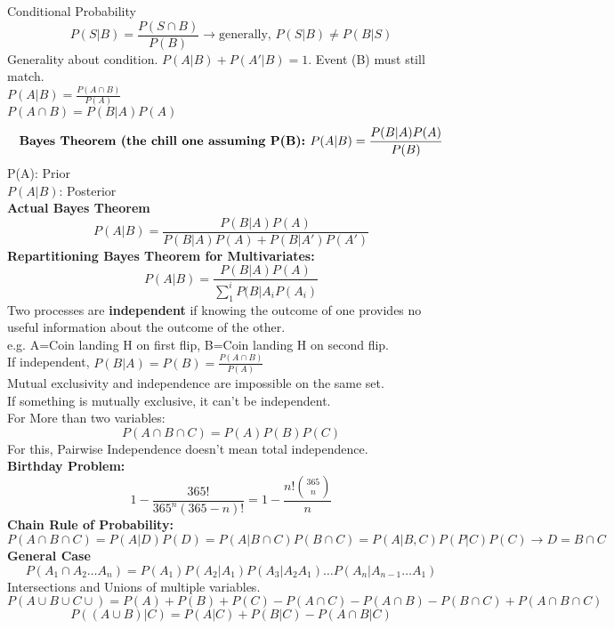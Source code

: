 \documentclass[a4paper, 12pt]{article}
\begin{document}
\begin{section}{Conditional Probability}
\begin{equation} 
P(S|B) = \frac{P(S\cap B)}{P(B)} \to \mbox{generally, } P(S|B)\neq P(B|S)
\end{equation}
Generality about condition. $P(A|B) + P(A'|B) = 1$. Event (B) must still match.\\
$P(A|B)=\frac{P(A\cap B)}{P(A)}$\\
$P(A\cap B)=P(B|A)P(A)$
\begin{equation} 
\mbox{\textbf{Bayes Theorem (the chill one assuming P(B):  }}
P(A|B)=\frac{P(B|A)P(A)}{P(B)}
\end{equation}
P(A): Prior\\
$P(A|B)$: Posterior\\
\textbf{Actual Bayes Theorem}
\begin{equation} 
	P(A|B)=\frac{P(B|A)P(A)}{P(B|A)P(A)+P(B|A')P(A')}
\end{equation}
\textbf{Repartitioning Bayes Theorem for Multivariates:}
\begin{equation} 
	P(A|B)=\frac{P(B|A)P(A)}{\sum_{1}^{i}P(B|A_{i}P(A_{i})}
\end{equation}
Two processes are \textbf{independent} if knowing the outcome of one provides
no useful information about the outcome of the other.\\
e.g. A=Coin landing H on first flip, B=Coin landing H on second flip.\\
If independent, $P(B|A)=P(B)=\frac{P(A\cap B)}{P(A)}$\\
Mutual exclusivity and independence are impossible on the same set.\\
If something is mutually exclusive, it can't be independent.\\
For More than two variables:\\
\begin{equation} 
P(A\cap B\cap C)=P(A)P(B)P(C)
\end{equation}
For this, Pairwise Independence doesn't mean total independence.\\
\textbf{Birthday Problem:}
\begin{equation} 
1-\frac{365!}{365^{n}(365-n)!}=1-\frac{n!{365 \choose n}}{n}
\end{equation}
\textbf{Chain Rule of Probability:}
\begin{equation} 
P(A\cap B\cap C)=P(A|D)P(D)=P(A|B\cap C)P(B\cap C)=P(A|B,C)P(P|C)P(C) \to
D=B\cap C
\end{equation}
\textbf{General Case}
\begin{equation} 
P(A_1\cap A_2\dots A_{n})=P(A_1)P(A_2|A_1)P(A_3|A_2A_1)\dots P(A_{n}|A_{n-1}\dots A_1)
\end{equation}
Intersections and Unions of multiple variables.
\begin{equation} 
P(A\cup B\cup C\cup)=P(A)+P(B)+P(C)-P(A\cap C)-P(A\cap B)-P(B\cap C)+
P(A\cap B\cap C)
\end{equation}
\begin{equation} 
P((A\cup B)|C)=P(A|C)+P(B|C)-P(A\cap B|C)
\end{equation}

\end{section}
\end{document}

